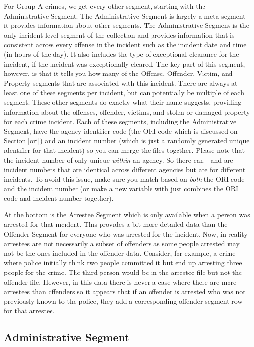 \documentclass[
]{krantz}
\begin{document}
For Group A crimes, we get every other segment, starting
with the Administrative Segment. The Administrative Segment
is largely a meta-segment - it provides information about
other segments. The Administrative Segment is the only
incident-level segment of the collection and provides
information that is consistent across every offense in the
incident such as the incident date and time (in hours of the
day). It also includes the type of exceptional clearance for
the incident, if the incident was exceptionally cleared. The
key part of this segment, however, is that it tells you how
many of the Offense, Offender, Victim, and Property segments
that are associated with this incident. There are always at
least one of these segments per incident, but can
potentially be multiple of each segment. These other
segments do exactly what their name suggests, providing
information about the offenses, offender, victims, and
stolen or damaged property for each crime incident. Each of
these segments, including the Administrative Segment, have
the agency identifier code (the ORI code which is discussed
on Section \ref{ori}) and an incident number (which is just
a randomly generated unique identifier for that incident) so
you can merge the files together. Please note that the
incident number of only unique \emph{within} an agency. So
there can - and are - incident numbers that are identical
across different agencies but are for different incidents.
To avoid this issue, make sure you match based on
\emph{both} the ORI code and the incident number (or make a
new variable with just combines the ORI code and incident
number together).

At the bottom is the Arrestee Segment which is only
available when a person was arrested for that incident. This
provides a bit more detailed data than the Offender Segment
for everyone who was arrested for the incident. Now, in
reality arrestees are not necessarily a subset of offenders
as some people arrested may not be the ones included in the
offender data. Consider, for example, a crime where police
initially think two people committed it but end up arresting
three people for the crime. The third person would be in the
arrestee file but not the offender file. However, in this
data there is never a case where there are more arrestees
than offenders so it appears that if an offender is arrested
who was not previously known to the police, they add a
corresponding offender segment row for that arrestee.

\subsection{Administrative
Segment}\label{administrative-segment}
\end{document}
